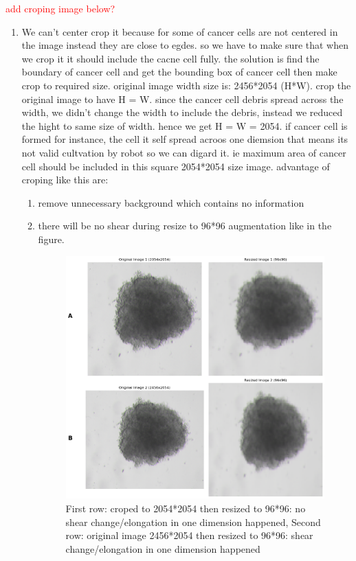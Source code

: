 \textcolor{red}{add croping image below?} 
\begin{enumerate}
  
  \item  We can't center crop it because for some of cancer cells are not centered in the image instead they are close to egdes. so we have to make 
  sure that when we crop it it should include the cacne cell fully. the solution is find the boundary of cancer cell and get the bounding box of cancer 
  cell then make crop to required size. original image width size is: 2456*2054 (H*W). crop the original image to have H = W. since the cancer cell debris
   spread across the width, we didn't change the width to include the debris,
   instead we reduced the hight to same size of width. hence we get H = W = 2054. if cancer cell is formed for instance, the cell it self spread acroos
    one diemsion that means its not valid cultvation by robot so we can digard it. ie maximum area of cancer cell should be included in this square 
    2054*2054 size image. advantage of croping like this are:
    \begin{enumerate}
      \item  remove unnecessary background which contains no information
      \item  there will be no shear during resize to 96*96 augmentation like in the figure.
      \begin{figure}[H]
        \centering
        \includegraphics[scale=0.46]{figures/long.png} 
        \caption{First row: croped to 2054*2054 then resized to 96*96: no shear change/elongation in one dimension happened, Second row: 
       original image 2456*2054 then resized to 96*96: shear change/elongation in one dimension happened}
        \label{fig:elong}
      \end{figure}
      

\end{enumerate}
\end{enumerate}
